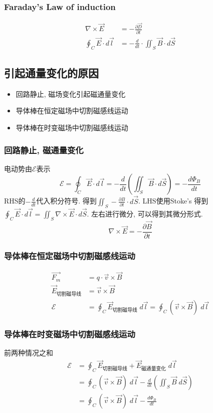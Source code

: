 \documentclass[a4paper]{report}
\begin{document}
\subsubsection{Faraday's Law of induction}
\begin{align*}
    \nabla\times \vec{E}&=-\frac{\partial \vec{D} }{\partial t}\\
    \oint_C \vec{E}\cdot d\vec{l}&=-\frac{d}{dt}\cdot \iint_S \vec{B}\cdot d\vec{S}
\end{align*}
\subsection{引起通量变化的原因}
\begin{itemize}
    \item 回路静止, 磁场变化引起磁通量变化
    \item 导体棒在恒定磁场中切割磁感线运动
    \item 导体棒在时变磁场中切割磁感线运动
\end{itemize}
\subsubsection{回路静止, 磁通量变化}
电动势由$\mathscr{E}$表示
$$\mathscr{E}=\oint_C \vec{E}\cdot d\vec{l}=-\frac{d}{dt}(\iint_S \vec{B}\cdot d\vec{S})=- \frac{d\Phi_B}{dt}$$
RHS的$-\frac{d}{dt}$代入积分符号. 得到$\iint_S -\frac{\partial B}{\partial t}\cdot d\vec{S}$. LHS使用Stoke's 得到$\oint_C \vec{E}\cdot d\vec{l}=\iint_S \nabla\times \vec{E} \cdot d\vec{S}$. 左右进行微分, 可以得到其微分形式. 
$$\nabla\times \vec{E} = -\frac{\partial \vec{B} }{\partial t} $$
\subsubsection{导体棒在恒定磁场中切割磁感线运动}

\begin{align*}
   \vec{F_m} &=q\cdot \vec{v} \times \vec{B}\\
   \vec{E}_{\text{切割磁导线}} &=\vec{v}\times \vec{B}\\
    \mathscr{E}&=\oint_C \vec{E}_{\text{切割磁导线}}\; d\vec{l}=\oint_C (\vec{v}\times\vec{B})\; d\vec{l}
\end{align*}
\subsubsection{导体棒在时变磁场中切割磁感线运动}
前两种情况之和
\begin{align*}
    \mathscr{E}&=\oint_C \vec{E}_{\text{切割磁导线}}+\vec{E}_{\text{磁通量变化}}\; d\vec{l}\\
    &=\oint_C (\vec{v}\times\vec{B})\; d\vec{l}-\frac{d}{dt}(\iint_S \vec{B}\; d\vec{S})\\
    &=\oint_C (\vec{v}\times\vec{B})\; d\vec{l}-\frac{d \Phi_B }{d t}
\end{align*}
\end{document}
